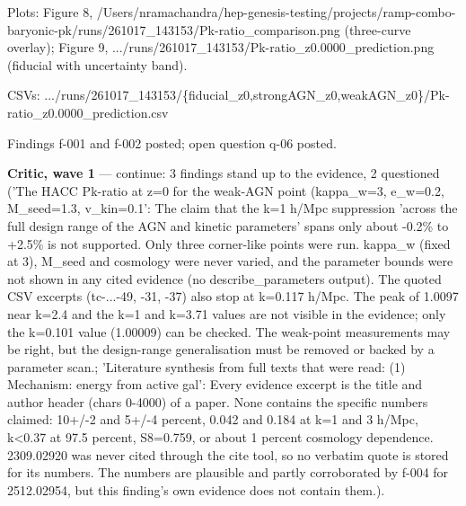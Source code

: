 \documentclass[11pt,a4paper]{article}
\begin{document}
Plots: Figure 8, /Users/nramachandra/hep-genesis-testing/projects/ramp-combo-baryonic-pk/runs/261017\_143153/Pk-ratio\_comparison.png (three-curve overlay); Figure 9, .../runs/261017\_143153/Pk-ratio\_z0.0000\_prediction.png (fiducial with uncertainty band).

CSVs: .../runs/261017\_143153/\{fiducial\_z0,strongAGN\_z0,weakAGN\_z0\}/Pk-ratio\_z0.0000\_prediction.csv

Findings f-001 and f-002 posted; open question q-06 posted.

\textbf{Critic, wave 1} --- continue: 3 findings stand up to the evidence, 2 questioned ('The HACC Pk-ratio at z=0 for the weak-AGN point (kappa\_w=3, e\_w=0.2, M\_seed=1.3, v\_kin=0.1': The claim that the k=1 h/Mpc suppression 'across the full design range of the AGN and kinetic parameters' spans only about -0.2\% to +2.5\% is not supported. Only three corner-like points were run. kappa\_w (fixed at 3), M\_seed and cosmology were never varied, and the parameter bounds were not shown in any cited evidence (no describe\_parameters output). The quoted CSV excerpts (tc-...-49, -31, -37) also stop at k=0.117 h/Mpc. The peak of 1.0097 near k=2.4 and the k=1 and k=3.71 values are not visible in the evidence; only the k=0.101 value (1.00009) can be checked. The weak-point measurements may be right, but the design-range generalisation must be removed or backed by a parameter scan.; 'Literature synthesis from full texts that were read: (1) Mechanism: energy from active gal': Every evidence excerpt is the title and author header (chars 0-4000) of a paper. None contains the specific numbers claimed: 10+/-2 and 5+/-4 percent, 0.042 and 0.184 at k=1 and 3 h/Mpc, k\textless{}0.37 at 97.5 percent, S8=0.759, or about 1 percent cosmology dependence. 2309.02920 was never cited through the cite tool, so no verbatim quote is stored for its numbers. The numbers are plausible and partly corroborated by f-004 for 2512.02954, but this finding's own evidence does not contain them.).
\end{document}
